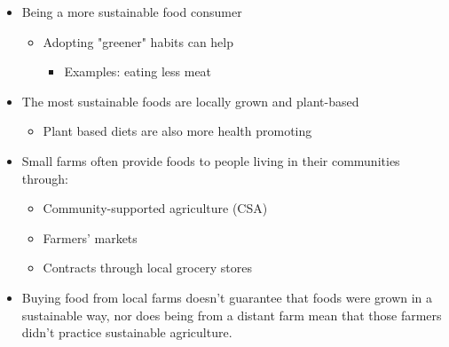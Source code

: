 \documentclass[12pt]{article}
\begin{document}
\begin{itemize}
\begin{itemize}
\begin{itemize}
                            \end{itemize}
                    \end{itemize}
                \item Being a more sustainable food consumer
                    \begin{itemize}
                        \item Adopting "greener" habits can help
                            \begin{itemize}
                                \item Examples: eating less meat
                            \end{itemize}
                    \end{itemize}
                \item The most sustainable foods are locally grown and plant-based
                    \begin{itemize}
                        \item Plant based diets are also more health promoting
                    \end{itemize}
                \item Small farms often provide foods to people living in their communities through:
                    \begin{itemize}
                        \item Community-supported agriculture (CSA)
                        \item Farmers' markets
                        \item Contracts through local grocery stores
                    \end{itemize}
                \item Buying food from local farms doesn't guarantee that foods were grown in a sustainable way, nor does being from a distant farm mean that those farmers didn't practice sustainable agriculture.
            \end{itemize}
\end{document}
